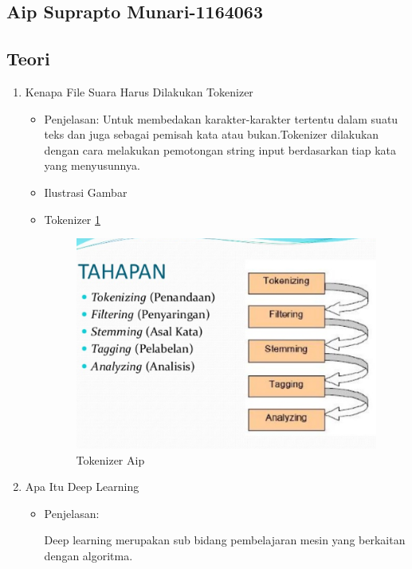 \begin{enumerate}
\section{Aip Suprapto Munari-1164063}
\subsection{Teori}
\begin{enumerate}
\item Kenapa File Suara Harus Dilakukan Tokenizer
\begin{itemize}
\item Penjelasan: Untuk membedakan karakter-karakter tertentu dalam suatu teks dan juga sebagai pemisah kata atau bukan.Tokenizer dilakukan dengan cara melakukan pemotongan string input berdasarkan tiap kata yang menyusunnya.
\par 
\par
\item Ilustrasi Gambar
\item Tokenizer \ref{teori1}
\begin{figure}[!hbtp]
\centering
\includegraphics[scale=0.7]{figures/AIP/g1.PNG}
\caption{Tokenizer Aip}
\label{teori1}
\end{figure}
\par
\end{itemize}
\par
\par

\item 	Apa Itu Deep Learning
\begin{itemize}
\item Penjelasan: 
\par  Deep learning merupakan sub bidang pembelajaran mesin yang berkaitan dengan algoritma.
\end{itemize}
\par
\par


\end{enumerate}
\end{enumerate}

